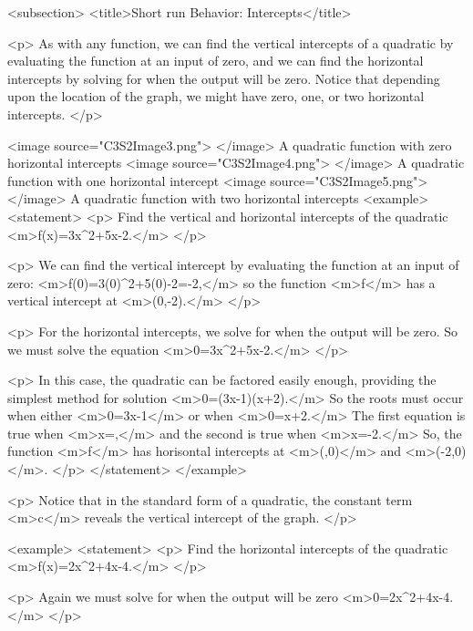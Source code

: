     <subsection>
        <title>Short run Behavior: Intercepts</title>

        <p>
            As with any function, we can find the vertical intercepts of a quadratic by evaluating the function at an input of zero, and we can find the horizontal intercepts by solving for when the output will be zero.
            Notice that depending upon the location of the graph, we might have zero, one, or two horizontal intercepts.
        </p>

        <image source="C3S2Image3.png">
        </image>
        A quadratic function with zero horizontal intercepts
        <image source="C3S2Image4.png">
        </image>
        A quadratic function with one horizontal intercept
        <image source="C3S2Image5.png">
        </image>
        A quadratic function with two horizontal intercepts
        <example>
            <statement>
                <p>
                    Find the vertical and horizontal intercepts of the quadratic <m>f(x)=3x^{2}+5x-2.</m>
                </p>

                <p>
                    We can find the vertical intercept by evaluating the function at an input of zero: <m>f(0)=3(0)^{2}+5(0)-2=-2,</m> so the function <m>f</m> has a vertical intercept at <m>(0,-2).</m>
                </p>

                <p>
                    For the horizontal intercepts, we solve for when the output will be zero.
                    So we must solve the equation <m>0=3x^{2}+5x-2.</m>
                </p>

                <p>
                    In this case, the quadratic can be factored easily enough, providing the simplest method for solution <m>0=(3x-1)(x+2).</m> So the roots must occur when either <m>0=3x-1</m> or when <m>0=x+2.</m> The first equation is true when <m>x=,</m> and the second is true when <m>x=-2.</m> So, the function <m>f</m> has horisontal intercepts at <m>(,0)</m> and <m>(-2,0)</m>.
                </p>
            </statement>
        </example>

        <p>
            Notice that in the standard form of a quadratic, the constant term <m>c</m> reveals the vertical intercept of the graph.
        </p>

        <example>
            <statement>
                <p>
                    Find the horizontal intercepts of the quadratic <m>f(x)=2x^{2}+4x-4.</m>
                </p>

                <p>
                    Again we must solve for when the output will be zero <m>0=2x^{2}+4x-4.</m>
                </p>

